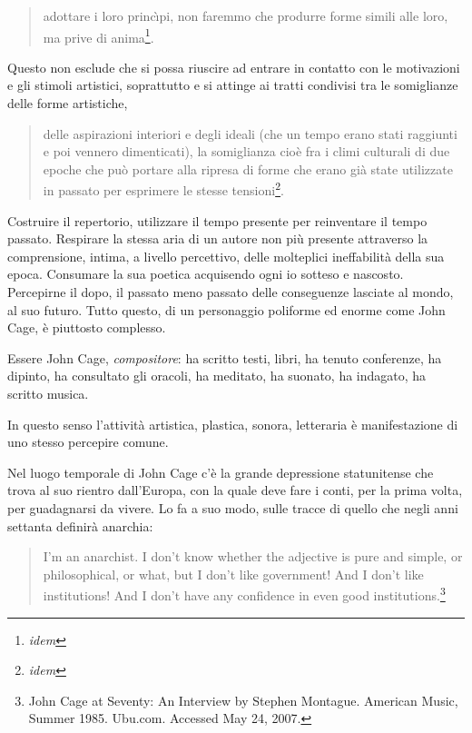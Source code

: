 \begin{quote}
	adottare i loro princ\`{\i}pi, non faremmo che produrre forme simili alle loro, ma prive di anima\footnote{\emph{idem}}.
\end{quote}

Questo non esclude che si possa riuscire ad entrare in contatto con le
motivazioni e gli stimoli artistici, soprattutto
e si attinge ai tratti
condivisi tra le somiglianze delle forme artistiche,

\begin{quote}
	delle aspirazioni interiori e degli ideali (che un tempo erano stati raggiunti
	e poi vennero dimenticati), la somiglianza cio\`e fra i climi culturali di due
	epoche che pu\`o portare alla ripresa di forme che erano gi\`a state utilizzate in
	passato per esprimere le stesse tensioni\footnote{\emph{idem}}.
\end{quote}

Costruire il repertorio, utilizzare il tempo presente per reinventare il tempo passato.
Respirare la stessa aria di un autore non pi\`u presente attraverso la comprensione, intima,
a livello percettivo, delle molteplici ineffabilit\`a della sua epoca.
Consumare la sua poetica acquisendo ogni io sotteso e nascosto. Percepirne il dopo,
il passato meno passato delle conseguenze lasciate al mondo, al suo futuro.
Tutto questo, di un personaggio poliforme ed enorme come John Cage, \`e piuttosto complesso.


Essere John Cage, \emph{compositore}: ha scritto testi, libri, ha tenuto conferenze, ha dipinto,
ha consultato gli oracoli, ha meditato, ha suonato, ha indagato, ha scritto musica.


In questo senso l'attivit\`a artistica, plastica, sonora, letteraria \`e manifestazione di uno
stesso percepire comune.

Nel luogo temporale di John Cage c'\`e la grande depressione statunitense che trova al suo rientro dall'Europa,
con la quale deve fare i conti, per la prima volta, per guadagnarsi da vivere. Lo fa a suo modo,
sulle tracce di quello che negli anni settanta definir\`a anarchia:

\begin{quote}
	I'm an anarchist. I don't know whether the adjective is pure and simple, or philosophical, or what, but I don't
	like government! And I don't like institutions! And I don't have any confidence in even good institutions.\footnote{John
		Cage at Seventy: An Interview by Stephen Montague. American Music, Summer 1985. Ubu.com. Accessed May 24, 2007.}
\end{quote}

